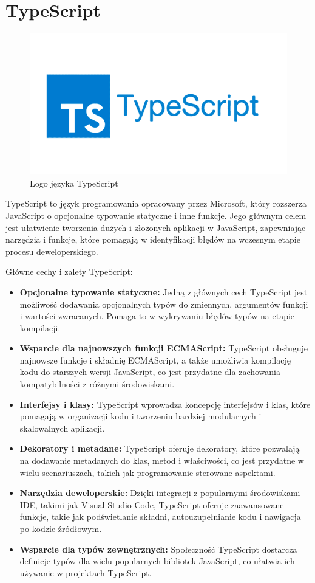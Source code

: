 \section{TypeScript}
\begin{figure}[h]
    \centering
    \includegraphics[width=0.5\linewidth]{./img/typescript.png}
    \caption{Logo języka TypeScript}
    \label{fig:TypeScript}
\end{figure}
TypeScript to język programowania opracowany przez Microsoft, który rozszerza JavaScript o opcjonalne typowanie statyczne i inne funkcje. Jego głównym celem jest ułatwienie tworzenia dużych i złożonych aplikacji w JavaScript, zapewniając narzędzia i funkcje, które pomagają w identyfikacji błędów na wczesnym etapie procesu deweloperskiego.

Główne cechy i zalety TypeScript:
\begin{itemize}
\item \textbf{Opcjonalne typowanie statyczne:} Jedną z głównych cech TypeScript jest możliwość dodawania opcjonalnych typów do zmiennych, argumentów funkcji i wartości zwracanych. Pomaga to w wykrywaniu błędów typów na etapie kompilacji.

\item \textbf{Wsparcie dla najnowszych funkcji ECMAScript:} TypeScript obsługuje najnowsze funkcje i składnię ECMAScript, a także umożliwia kompilację kodu do starszych wersji JavaScript, co jest przydatne dla zachowania kompatybilności z różnymi środowiskami.

\item \textbf{Interfejsy i klasy:} TypeScript wprowadza koncepcję interfejsów i klas, które pomagają w organizacji kodu i tworzeniu bardziej modularnych i skalowalnych aplikacji.

\item \textbf{Dekoratory i metadane:} TypeScript oferuje dekoratory, które pozwalają na dodawanie metadanych do klas, metod i właściwości, co jest przydatne w wielu scenariuszach, takich jak programowanie sterowane aspektami.

\item \textbf{Narzędzia deweloperskie:} Dzięki integracji z popularnymi środowiskami IDE, takimi jak Visual Studio Code, TypeScript oferuje zaawansowane funkcje, takie jak podświetlanie składni, autouzupełnianie kodu i nawigacja po kodzie źródłowym.

\item \textbf{Wsparcie dla typów zewnętrznych:} Społeczność TypeScript dostarcza definicje typów dla wielu popularnych bibliotek JavaScript, co ułatwia ich używanie w projektach TypeScript.
\end{itemize}

